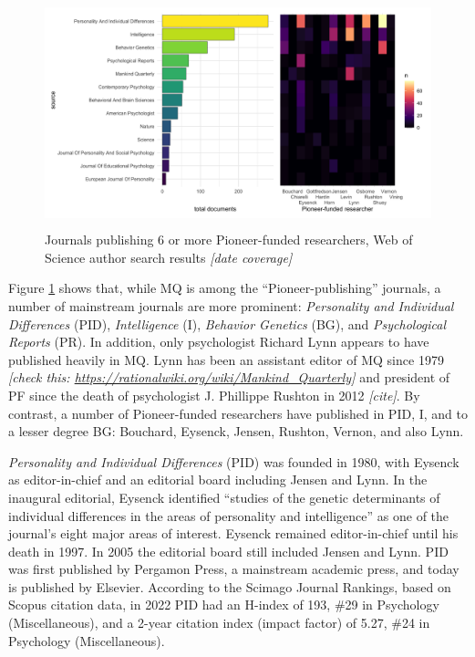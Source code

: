 \documentclass[12pt]{article}
\begin{document}
\begin{figure}
\centering
\includegraphics[width=4.76in,height=2.6in]{img/wos_results.png}
\caption{Journals publishing 6 or more Pioneer-funded researchers, Web of Science author search results \emph{{[}date coverage{]}} \label{fig:wos}}
\end{figure}

Figure \ref{fig:wos} shows that, while MQ is among the ``Pioneer-publishing'' journals, a number of mainstream journals are more prominent: \emph{Personality and Individual Differences} (PID), \emph{Intelligence} (I), \emph{Behavior Genetics} (BG), and \emph{Psychological Reports} (PR). In addition, only psychologist Richard Lynn appears to have published heavily in MQ. Lynn has been an assistant editor of MQ since 1979 \emph{{[}check this: \url{https://rationalwiki.org/wiki/Mankind_Quarterly}{]}} and president of PF since the death of psychologist J. Phillippe Rushton in 2012 \emph{{[}cite{]}}. By contrast, a number of Pioneer-funded researchers have published in PID, I, and to a lesser degree BG: Bouchard, Eysenck, Jensen, Rushton, Vernon, and also Lynn.

\emph{Personality and Individual Differences} (PID) was founded in 1980, with Eysenck as editor-in-chief and an editorial board including Jensen and Lynn. In the inaugural editorial, Eysenck identified ``studies of the genetic determinants of individual differences in the areas of personality and intelligence'' as one of the journal's eight major areas of interest. Eysenck remained editor-in-chief until his death in 1997. In 2005 the editorial board still included Jensen and Lynn. PID was first published by Pergamon Press, a mainstream academic press, and today is published by Elsevier. According to the Scimago Journal Rankings, based on Scopus citation data, in 2022 PID had an H-index of 193, \#29 in Psychology (Miscellaneous), and a 2-year citation index (impact factor) of 5.27, \#24 in Psychology (Miscellaneous).
\end{document}
